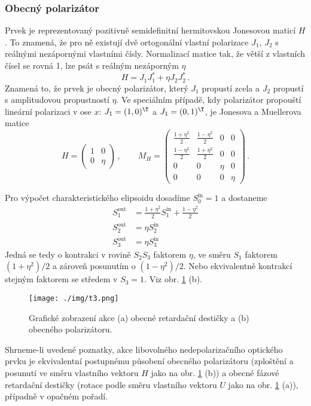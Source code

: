 \subsubsection*{Obecný polarizátor}

Prvek je reprezentovaný pozitivně semidefinitní hermitovskou Jonesovou maticí $H$.
To znamená, že pro ně existují dvě ortogonální vlastní polarizace $J_1$, $J_2$ s reálnými nezápornými vlastními čísly.
Normalizací matice tak, že větší z vlastních čísel se rovná 1, lze psát s reálným nezáporným $\eta$
\begin{equation}
H=J_1 J_1^* + \eta J_2 J_2^* \,.
\end{equation}
Znamená to, že prvek je obecný polarizátor, který $J_1$ propustí zcela a $J_2$ propustí s amplitudovou propustností $\eta$.
Ve speciálním případě, kdy polarizátor propouští lineární polarizaci v ose $x$: $J_1=(1,0)^\T$ a $J_1=(0,1)^\T$, je Jonesova a Muellerova matice
\begin{equation}
H=\begin{pmatrix}
1 & 0 \\ 0 & \eta
\end{pmatrix} \,, \qquad
M_H=\begin{pmatrix}
\frac{1+\eta^2}{2} & \frac{1-\eta^2}{2} & 0 & 0 \\ \frac{1-\eta^2}{2} & \frac{1+\eta^2}{2} & 0 & 0 \\
0 & 0 & \eta & 0 \\ 0 & 0 & 0 & \eta
\end{pmatrix} \,.
\end{equation}

Pro výpočet charakteristického elipsoidu dosadíme $S_0^{\textrm{in}}=1$ a dostaneme
\begin{align}
    S_1^{\textrm{out}}&=\frac{1+\eta^2}{2} S_1^{\textrm{in}}+\frac{1-\eta^2}{2} \\
    S_2^{\textrm{out}}&=\eta S_2^{\textrm{in}} \\
    S_3^{\textrm{out}}&=\eta S_3^{\textrm{in}}
\end{align}
Jedná se tedy o kontrakci v rovině $S_2S_3$ faktorem $\eta$, ve směru $S_1$ faktorem $(1+\eta^2)/2$ a zároveň posunutím o $(1-\eta^2)/2$.
Nebo ekvivalentně kontrakcí stejným faktorem se středem v $S_3=1$. Viz obr. \ref{f:akce muelleru} (b).

\begin{figure}\centering
\texttt{[image: ./img/t3.png]}
\caption{Grafické zobrazení akce (a) obecné retardační destičky a (b) obecného polarizátoru.}\label{f:akce muelleru}
\end{figure}

Shrneme-li uvedené poznatky, akce libovolného nedepolarizačního optického prvku je ekvivalentní postupnému působení obecného polarizátoru (zploštění a posunutí ve směru vlastního vektoru $H$ jako na obr. \ref{f:akce muelleru} (b)) a obecné fázové retardační destičky (rotace podle směru vlastního vektoru $U$ jako na obr. \ref{f:akce muelleru} (a)), případně v opačném pořadí.
